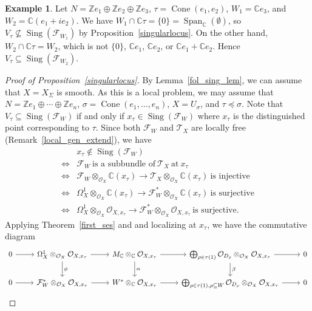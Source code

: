 \documentclass[12pt,reqno]{amsart}
\theoremstyle{definition}
\newtheorem{example}[theorem]{Example}
\newcommand{\mc}{\mathcal}
\newcommand{\mb}{\mathbb}
\newcommand{\on}{\operatorname}
\newcommand\cT{{\mathcal{T}}}
\newcommand\bC{{\mathbb C}}
\begin{document}
\begin{example}
    Let $N=\mb Ze_1\oplus\mb Ze_2\oplus\mb Ze_3$, $\tau=\on{Cone}(e_1,e_2)$, $W_1 = \bC e_3$, and $W_2 = \bC(e_1+ie_2)$. 
    We have $W_1\cap\bC\tau = \{0\}=\on{Span}_\bC(\emptyset)$, so $V_\tau\nsubseteq\on{Sing}(\mc F_{W_1})$ by Proposition~\ref{singularlocus}. 
    On the other hand, $W_2\cap\bC\tau=W_2$, which is not $\{0\}$, $\bC e_1$, $\bC e_2$, or $\bC e_1 + \bC e_2$. Hence $V_\tau\subseteq\on{Sing}(\mc F_{W_2})$.
\end{example}

\begin{proof}[{Proof of Proposition~\ref{singularlocus}}]
    By Lemma~\ref{fol_sing_lem}, we can assume that $X=X_\Sigma$ is smooth.  
    As this is a local problem, 
    we may assume that $N=\mb Ze_1\oplus\cdots\oplus\mb Ze_n$, $\sigma=\on{Cone}(e_1,\ldots,e_n)$, $X=U_\sigma$, and $\tau\preceq\sigma$. Note that $V_\tau\subseteq \on{Sing}(\mc F_W)$ if and only if $x_\tau\in\on{Sing}(\mc F_W)$ where $x_\tau$ is the distinguished point corresponding to $\tau$. Since both $\mc F_W$ and $\cT_X$ are locally free (Remark~\ref{local_gen_extend}), we have
    \begin{align*}
    & x_\tau\notin\on{Sing}(\mc F_W)\\
    \Leftrightarrow {} & \mc F_W\ \text{is a subbundle of}\ \cT_{X}\ \text{at}\ x_\tau\\
    \Leftrightarrow {} & \mc F_{W}\otimes_{\mc O_{X}}\mb C(x_\tau)\rightarrow \mc T_{X}\otimes_{\mc O_{X}}\mb C(x_\tau)\ \text{is injective}\\
    \Leftrightarrow {} & \Omega^1_{X}\otimes_{\mc O_{X}}\mb C(x_\tau)\rightarrow \mc F_{W}^*\otimes_{\mc O_{X}}\mb C(x_\tau)\ \text{is surjective}\\
    \Leftrightarrow {} & \Omega^1_X\otimes_{\mc O_X}\mc O_{X,x_\tau}\rightarrow \mc F_W^*\otimes_{\mc O_X}\mc O_{X,x_\tau}\ \text{is surjective}.
    \end{align*}
    Applying Theorem~\ref{first_ses} and \cite[Theorem 8.1.4]{CLS11} and localizing at $x_\tau$, we have the commutative diagram
    \[
    \begin{tikzcd}
        0\arrow[r]& \Omega^1_X\otimes_{\mc O_X}\mc O_{X,x_\tau}\arrow[r]\arrow[d,"\phi"] &M_\mb C\otimes_{\mb C}\mc O_{X,x_\tau}\arrow[r]\arrow[d,"\alpha"] &\bigoplus_{\rho\in\tau(1)}\mc O_{D_\rho}\otimes_{\mc O_X}\mc O_{X,x_\tau} \arrow[r]\arrow[d,"\beta"] &0 \\ 
        0\arrow[r]& \mc F_W^*\otimes_{\mc O_X}\mc O_{X,x_\tau}\arrow[r] & W^*\otimes_{\mb C}\mc O_{X,x_\tau}\arrow[r] &\bigoplus_{\rho\in\tau(1),\rho\subseteq W}\mc O_{D_\rho}\otimes_{\mc O_X}\mc O_{X,x_\tau} \arrow[r] &0

\end{tikzcd}\]
\end{proof}
\end{document}
